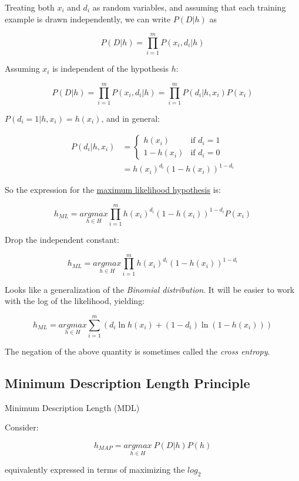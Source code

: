 Treating both \(x_i\) and \(d_i\) as random variables, and assuming that
each training example is drawn independently, we can write \(P(D|h)\) as

\[P(D|h)=\prod_{i=1}^mP(x_i,d_i|h)\]

Assuming \(x_i\) is independent of the hypothesis \(h\):

\[P(D|h)=\prod_{i=1}^mP(x_i,d_i|h)=\prod_{i=1}^mP(d_i|h,x_i)P(x_i)\]

\(P(d_i=1|h,x_i)=h(x_i)\), and in general:

\begin{equation*}
\begin{aligned}
P(d_i|h,x_i)&=\begin{cases}
h(x_i) & \text{if }d_i=1\\
1-h(x_i) & \text{if }d_i=0
\end{cases}\\
&=h(x_i)^{d_i}(1-h(x_i))^{1-d_i}
\end{aligned}
\end{equation*}

So the expression for the \underline{maximum likelihood hypothesis} is:

\[h_{ML}=\underset{h\in H}{argmax}\prod_{i=1}^mh(x_i)^{d_i}(1-h(x_i))^{1-d_i}P(x_i)\]

Drop the independent constant:

\[h_{ML}=\underset{h\in H}{argmax}\prod_{i=1}^mh(x_i)^{d_i}(1-h(x_i))^{1-d_i}\]

Looks like a generalization of the \emph{Binomial distribution}. It will
be easier to work with the log of the likelihood, yielding:

\[h_{ML}=\underset{h\in H}{argmax}\sum_{i=1}^m(d_i\ln h(x_i)+(1-d_i)\ln(1-h(x_i)))\]

The negation of the above quantity is sometimes called the \emph{cross
entropy}.

\hypertarget{minimum-description-length-principle}{%
\subsection{Minimum Description Length
Principle}\label{minimum-description-length-principle}}

Minimum Description Length (MDL)

Consider:

\[h_{MAP}=\underset{h\in H}{argmax}\ P(D|h)P(h)\]

equivalently expressed in terms of maximizing the \(log_2\)

